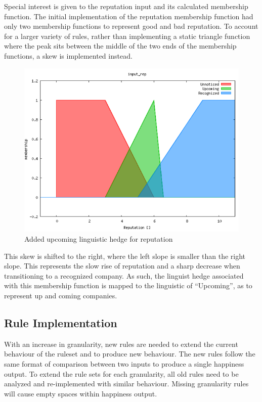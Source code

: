 \documentclass[12pt,fleqn,reqno,letterpaper]{article}
\begin{document}
Special interest is given to the reputation input and its calculated membership function.  The initial implementation of the reputation membership function had only two membership functions to represent good and bad reputation.  To account for a larger variety of rules, rather than implementing a static triangle function where the peak sits between the middle of the two ends of the membership functions, a skew is implemented instead.

\begin{figure}[H]
  \centering
  \includegraphics[scale=0.5,natwidth=656,natheight=501]{fig/upcoming_skew.png}
  \caption{Added upcoming linguistic hedge for reputation}
  \label{fig:UPCOMING-SKEW}
\end{figure}

This skew is shifted to the right, where the left slope is smaller than the right slope.  This represents the slow rise of reputation and a sharp decrease when transitioning to a recognized company.  As such, the linguist hedge associated with this membership function is mapped to the linguistic of “Upcoming”, as to represent up and coming companies.

\subsection{Rule Implementation}
With an increase in granularity, new rules are needed to extend the current behaviour of the ruleset and to produce new behaviour.  The new rules follow the same format of comparison between two inputs to produce a single happiness output.  To extend the rule sets for each granularity, all old rules need to be analyzed and re-implemented with similar behaviour.  Missing granularity rules will cause empty spaces within happiness output.
\end{document}
